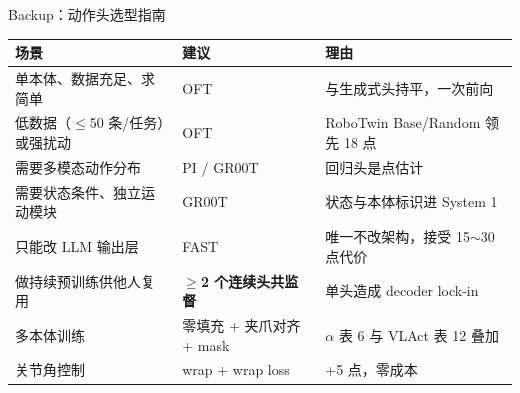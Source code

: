 \documentclass[aspectratio=169,10pt]{beamer}
\begin{document}
\begin{frame}{Backup：动作头选型指南}
  \begin{center}\small
  \begin{tabular}{p{5.2cm}p{2.6cm}p{5.4cm}}
    \toprule
    场景 & 建议 & 理由 \\
    \midrule
    单本体、数据充足、求简单 & OFT & 与生成式头持平，一次前向 \\
    低数据（$\le$50 条/任务）或强扰动 & OFT & RoboTwin Base/Random 领先 18 点 \\
    需要多模态动作分布 & PI / GR00T & 回归头是点估计 \\
    需要状态条件、独立运动模块 & GR00T & 状态与本体标识进 System 1 \\
    只能改 LLM 输出层 & FAST & 唯一不改架构，接受 15$\sim$30 点代价 \\
    做持续预训练供他人复用 & \textbf{$\ge$2 个连续头共监督} & 单头造成 decoder lock-in \\
    多本体训练 & 零填充 + 夹爪对齐 + mask & $\alpha$ 表 6 与 VLAct 表 12 叠加 \\
    关节角控制 & wrap + wrap loss & +5 点，零成本 \\
    \bottomrule
  \end{tabular}
  \end{center}
\end{frame}
\end{document}
